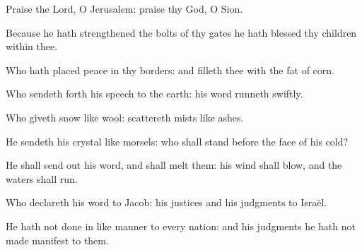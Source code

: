 ﻿\item Praise the Lord, O Jerusalem: praise thy God, O Sion. 
\item Because he hath strengthened the bolts of thy gates he hath blessed thy children within thee. 
\item Who hath placed peace in thy borders: and filleth thee with the fat of corn.
\item Who sendeth forth his speech to the earth: his word runneth swiftly.
\item Who giveth snow like wool: scattereth mists like ashes.
\item He sendeth his crystal like morsels: who shall stand before the face of his cold?
\item He shall send out his word, and shall melt them: his wind shall blow, and the waters shall run.
\item Who declareth his word to Jacob: his justices and his judgments to Israël.
\item He hath not done in like manner to every nation: and his judgments he hath not made manifest to them.